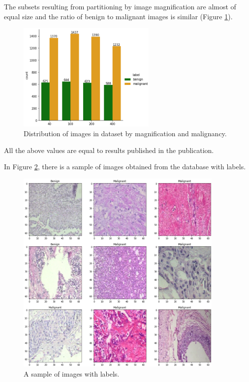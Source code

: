 \documentclass[12pt]{article}
\begin{document}
The subsets resulting from partitioning by image magnification are almost of equal size and the ratio of benign to malignant images is similar (Figure  \ref{fig:magnification}).

\begin{figure}[!ht]
\centering
\includegraphics[width=0.6\textwidth]{magnification.png}
\caption{\label{fig:magnification}Distribution of images in dataset by magnification and malignancy.}
\end{figure}

All the above values are equal to results published in the publication\cite{1}. 

In Figure \ref{fig:sample}, there is a sample of images obtained from the database with labels.

\begin{figure}[!ht]
\centering
\includegraphics[width=0.9\textwidth]{sample.png}
\caption{\label{fig:sample}A sample of images with labels.}
\end{figure}
\end{document}
